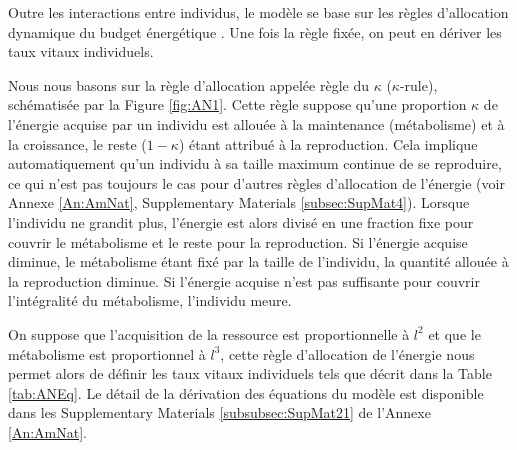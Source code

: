Outre les interactions entre individus, le modèle se base sur les règles
d'allocation dynamique du budget énergétique \autocites{kooijman2000a}. Une fois la règle fixée, on peut en
dériver les taux vitaux individuels. 

Nous nous basons sur la règle d'allocation appelée règle du
$\kappa$ ($\kappa$-rule), schématisée par la Figure \ref{fig:AN1}. Cette règle
suppose qu'une proportion $\kappa$ de l'énergie acquise par un individu est
allouée à la maintenance (métabolisme) et à la croissance, le reste ($1-\kappa$)
étant attribué à la reproduction. Cela implique automatiquement qu'un individu à sa
taille maximum continue de se reproduire, ce qui n'est pas toujours le cas pour
d'autres règles d'allocation de l'énergie (voir Annexe \ref{An:AmNat},
Supplementary Materials \ref{subsec:SupMat4}). Lorsque l'individu ne grandit
plus, l'énergie est alors divisé en une fraction fixe pour couvrir le
métabolisme et le reste pour la reproduction. Si l'énergie acquise diminue, le
métabolisme étant fixé par la taille de l'individu, la quantité
allouée à la reproduction diminue. Si l'énergie acquise n'est pas suffisante
pour couvrir l'intégralité du métabolisme, l'individu meure.

On suppose que l'acquisition de la ressource est proportionnelle à $l^2$
et que le métabolisme est proportionnel à $l^3$, cette règle d'allocation de
l'énergie nous permet alors de définir les taux vitaux individuels tels que
décrit dans la Table \ref{tab:ANEq}. Le détail de la dérivation des équations du modèle
est disponible dans les Supplementary Materials \ref{subsubsec:SupMat21} de
l'Annexe \ref{An:AmNat}. 

